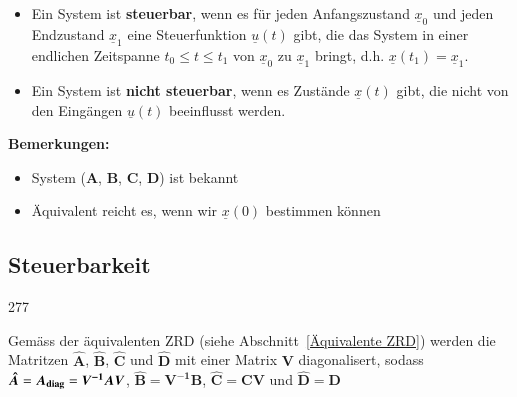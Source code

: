 \begin{itemize}
    \item Ein System ist \textbf{steuerbar}, wenn es für jeden Anfangszustand $\underline{x}_0$ und jeden Endzustand $\underline{x}_1$
        eine Steuerfunktion $\underline{u}(t)$ gibt, die das System in einer endlichen Zeitspanne $t_0 \leq t \leq t_1$ von
        $\underline{x}_0$ zu $\underline{x}_1$ bringt, d.h. $\underline{x}(t_1) = \underline{x}_1$. 
    \item Ein System ist \textbf{nicht steuerbar}, wenn es Zustände $\underline{x}(t)$ gibt, die nicht von den 
        Eingängen $\underline{u}(t)$ beeinflusst werden. 
\end{itemize}

\vspace{0.2cm}
\textbf{Bemerkungen: }
\begin{itemize}
    \item System ($\bm{A}$, $\bm{B}$, $\bm{C}$, $\bm{D}$) ist bekannt 
    \item Äquivalent reicht es, wenn wir $\underline{x}(0)$ bestimmen können
\end{itemize}
    

\subsection{Steuerbarkeit}{277}

Gemäss der äquivalenten ZRD (siehe Abschnitt~\ref{Äquivalente ZRD}) werden die Matritzen $\bm{\hat{A}}$,
$\bm{\hat{B}}$, $\bm{\hat{C}}$ und $\bm{\hat{D}}$ mit einer Matrix $\bm{V}$ diagonalisert, sodass 
$\bm{\hat{A}} = \bm{A_{\rm diag}} = \bm{V^{-1} A V}$, $\bm{\hat{B}} = \bm{V^{-1} B}$, 
$\bm{\hat{C}} = \bm{C V}$ und $\bm{\hat{D}} = \bm{D}$

\vspace{0.2cm}

\vspace{0.2cm}



